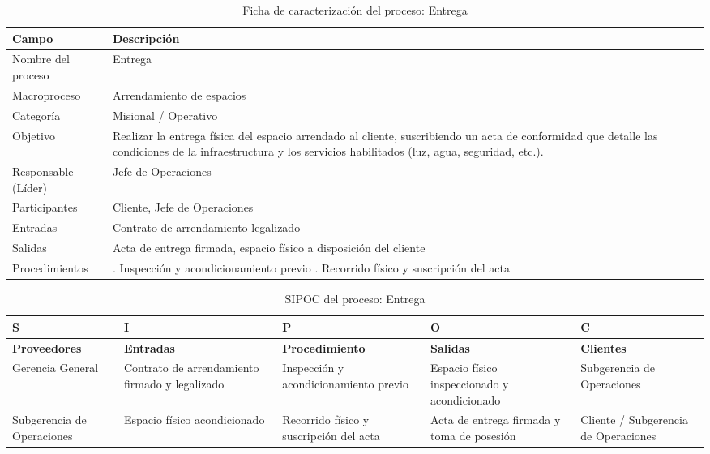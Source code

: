 \documentclass[11pt, a4paper, oneside]{report}
\begin{document}
\begin{table}[H]
\centering\small
\renewcommand{\arraystretch}{1.35}
\setlength{\tabcolsep}{6pt}
\begin{tabularx}{\textwidth}{|>{\raggedright\arraybackslash}p{}|>{\raggedright\arraybackslash}X|}
\hline
\rowcolor{upeu_dark}
\color{white}\bfseries Campo & \color{white}\bfseries Descripción \\ \hline
\rowcolor{gray!10}
Nombre del proceso & Entrega \\ \hline
Macroproceso & Arrendamiento de espacios \\ \hline
\rowcolor{gray!10}
Categoría & Misional / Operativo \\ \hline
Objetivo & Realizar la entrega física del espacio arrendado al cliente, suscribiendo un acta de conformidad que detalle las condiciones de la infraestructura y los servicios habilitados (luz, agua, seguridad, etc.). \\ \hline
\rowcolor{gray!10}
Responsable (Líder) & Jefe de Operaciones \\ \hline
Participantes & Cliente, Jefe de Operaciones \\ \hline
\rowcolor{gray!10}
Entradas & Contrato de arrendamiento legalizado \\ \hline
Salidas & Acta de entrega firmada, espacio físico a disposición del cliente \\ \hline
\rowcolor{gray!10}
Procedimientos & 1. Inspección y acondicionamiento previo \newline 2. Recorrido físico y suscripción del acta \\ \hline
\end{tabularx}
\caption{Ficha de caracterización del proceso: Entrega}
\end{table}

\begin{table}[H]
\centering\small
\renewcommand{\arraystretch}{1.3}
\setlength{\tabcolsep}{4pt}
\begin{tabularx}{\textwidth}{|>{\raggedright\arraybackslash}p{}|>{\raggedright\arraybackslash}p{}|>{\raggedright\arraybackslash}p{}|>{\raggedright\arraybackslash}p{}|>{\raggedright\arraybackslash}X|}
\hline
\rowcolor{upeu_dark}
\color{white}\bfseries S & \color{white}\bfseries I & \color{white}\bfseries P & \color{white}\bfseries O & \color{white}\bfseries C \\ \hline
\rowcolor{upeu_light}
\bfseries Proveedores & \bfseries Entradas & \bfseries Procedimiento & \bfseries Salidas & \bfseries Clientes \\ \hline
Gerencia General &
Contrato de arrendamiento firmado y legalizado &
Inspección y acondicionamiento previo &
Espacio físico inspeccionado y acondicionado &
Subgerencia de Operaciones \\ \hline
\rowcolor{gray!10}
Subgerencia de Operaciones &
Espacio físico acondicionado &
Recorrido físico y suscripción del acta &
Acta de entrega firmada y toma de posesión &
Cliente / Subgerencia de Operaciones \\ \hline
\end{tabularx}
\caption{SIPOC del proceso: Entrega}
\end{table}
\end{document}
